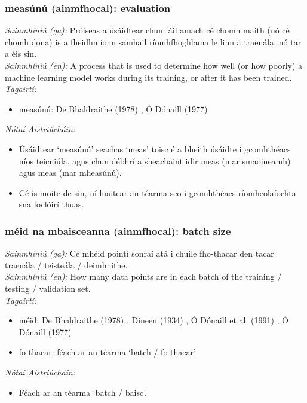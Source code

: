 \documentclass{article}
\begin{document}
\subsubsection*{measúnú (ainmfhocal): evaluation}
 \noindent \textit{Sainmhíniú (ga):} Próiseas a úsáidtear chun fáil amach cé chomh maith (nó cé chomh dona) is a fheidhmíonn samhail ríomhfhoghlama le linn a traenála, nó tar a éis sin.
\\
 \noindent \textit{Sainmhíniú (en):} A process that is used to determine how well (or how poorly) a machine learning model works during its training, or after it has been trained.
\\
 \noindent \textit{Tagairtí:}
\begin{itemize}
	\item measúnú: De Bhaldraithe (1978) \cite{de-bhaldraithe}, Ó Dónaill (1977) \cite{odonaill}
\end{itemize}

 \noindent \textit{Nótaí Aistriúcháin:}
\begin{itemize}
	\item Úsáidtear `measúnú' seachas `meas' toisc é a bheith úsáidte i gcomhthéacs níos teicniúla, agus chun débhrí a sheachaint idir meas (mar smaoineamh) agus meas (mar mheasúnú).
	\item Cé is moite de sin, ní luaitear an téarma seo i gcomhthéacs ríomheolaíochta sna foclóirí thuas.
\end{itemize}


\subsubsection*{méid na mbaisceanna (ainmfhocal): batch size}
 \noindent \textit{Sainmhíniú (ga):} Cé mhéid pointí sonraí atá i chuile fho-thacar den tacar traenála / teisteála / deimhnithe.
\\
 \noindent \textit{Sainmhíniú (en):} How many data points are in each batch of the training / testing / validation set.
\\
 \noindent \textit{Tagairtí:}
\begin{itemize}
	\item méid: De Bhaldraithe (1978) \cite{de-bhaldraithe}, Dineen (1934) \cite{dineen}, Ó Dónaill et al. (1991) \cite{focloir-beag}, Ó Dónaill (1977) \cite{odonaill}
	\item fo-thacar: féach ar an téarma `batch / fo-thacar'
\end{itemize}

 \noindent \textit{Nótaí Aistriúcháin:}
\begin{itemize}
	\item Féach ar an téarma `batch / baisc'.
\end{itemize}
\end{document}
